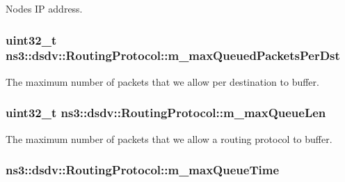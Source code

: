 Nodes IP address. 

\subsubsection[{\texorpdfstring{m\+\_\+max\+Queued\+Packets\+Per\+Dst}{m_maxQueuedPacketsPerDst}}]{\setlength{\rightskip}{0pt plus 5cm}uint32\+\_\+t ns3\+::dsdv\+::\+Routing\+Protocol\+::m\+\_\+max\+Queued\+Packets\+Per\+Dst\hspace{0.3cm}{\ttfamily [private]}}\hypertarget{classns3_1_1dsdv_1_1RoutingProtocol_a2bfab14f96b69300b5b86aeaca2b6f64}{}\label{classns3_1_1dsdv_1_1RoutingProtocol_a2bfab14f96b69300b5b86aeaca2b6f64}


The maximum number of packets that we allow per destination to buffer. 

\subsubsection[{\texorpdfstring{m\+\_\+max\+Queue\+Len}{m_maxQueueLen}}]{\setlength{\rightskip}{0pt plus 5cm}uint32\+\_\+t ns3\+::dsdv\+::\+Routing\+Protocol\+::m\+\_\+max\+Queue\+Len\hspace{0.3cm}{\ttfamily [private]}}\hypertarget{classns3_1_1dsdv_1_1RoutingProtocol_aedf19d36f43f8c0bed80d22b2eec343c}{}\label{classns3_1_1dsdv_1_1RoutingProtocol_aedf19d36f43f8c0bed80d22b2eec343c}


The maximum number of packets that we allow a routing protocol to buffer. 

\subsubsection[{\texorpdfstring{m\+\_\+max\+Queue\+Time}{m_maxQueueTime}}]{ ns3\+::dsdv\+::\+Routing\+Protocol\+::m\+\_\+max\+Queue\+Time\hspace{0.3cm}{\ttfamily [private]}}\hypertarget{classns3_1_1dsdv_1_1RoutingProtocol_a99d9a7c27e476c4f0a2c93f889ab8e13}{}\label{classns3_1_1dsdv_1_1RoutingProtocol_a99d9a7c27e476c4f0a2c93f889ab8e13}


